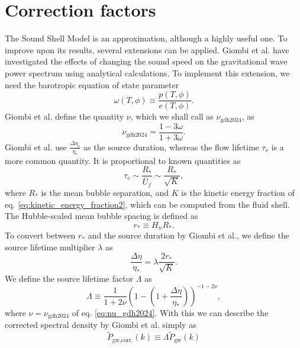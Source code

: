 \section{Correction factors}
\label{correction_factors}
The Sound Shell Model is an approximation, although a highly useful one.
To improve upon its results, several extensions can be applied.
Giombi et al. have investigated the effects of changing the sound speed on the gravitational wave power spectrum using analytical calculations.
To implement this extension, we need the barotropic equation of state parameter
\cite[p. 3]{giombi_cs_2024}
\begin{equation}
\omega(T,\phi) \equiv \frac{p(T,\phi)}{e(T,\phi)}.
\end{equation}
Giombi et al. define the quantity $\nu$, which we shall call as $\nu_\text{gdh2024}$, as
\cite[eq. 2.11]{giombi_cs_2024}
\begin{equation}
\nu_\text{gdh2024} = \frac{1 - 3\omega}{1 + 3\omega}.
\label{eq:nu_gdh2024}
\end{equation}
Giombi et al. use $\frac{\Delta \eta_v}{\eta_*}$ as the source duration,
whereas the flow lifetime $\tau_v$ is a more common quantity.
It is proportional to known quantities as
\cites[p. 3]{hindmarsh_gw_pt_2019}[p. 6]{gowling_lisa_2021}
\begin{equation}
\tau_v \sim \frac{R_*}{\bar{U}_f} \sim \frac{R_*}{\sqrt{K}},
\end{equation}
where $R_*$ is the mean bubble separation, and
$K$ is the kinetic energy fraction of eq. \eqref{eq:kinetic_energy_fraction2},
which can be computed from the fluid shell.
The Hubble-scaled mean bubble spacing is defined as
\cite[eq. 2.2]{gowling_lisa_2021}
\begin{equation}
r_* \equiv H_n R_*.
\end{equation}
To convert between $r_*$ and the source duration by Giombi et al.,
we define the source lifetime multiplier $\lambda$ as
\begin{equation}
\frac{\Delta \eta}{\eta_*} = \lambda \frac{2 r_*}{\sqrt{K}}.
\end{equation}
We define the source lifetime factor $\Lambda$ as
\cite[eq. 3.13]{giombi_cs_2024}
\begin{equation}
\Lambda \equiv \frac{1}{1 + 2\nu} \left(1 - \left(1 + \frac{\Delta \eta}{\eta_*} \right) \right)^{-1-2\nu},
\end{equation}
where $\nu = \nu_\text{gdh2024}$ of eq. \eqref{eq:nu_gdh2024}.
With this we can describe the corrected spectral density by Giombi et al. simply as
\begin{equation}
\tilde{P}_\text{gw,corr.}(k)
\equiv \Lambda \tilde{P}_\text{gw}(k)
\end{equation}

